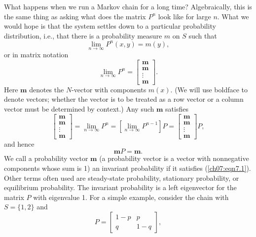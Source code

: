 \documentclass{stml-l}
\theoremstyle{definition}
\numberwithin{equation}{chapter}
\numberwithin{figure}{chapter}
\numberwithin{figure}{section}
\begin{document}
What happens when we run a Markov chain for a long time?
Algebraically, this is the same thing as asking what does the matrix
$P^{n}$ look like for large $n$. What we would hope is that the
system settles down to a particular probability distribution, i.e.,
that there is a probability measure $m$ on $S$ such that
\begin{equation*}
\lim\limits_{n\rightarrow\infty}P^{n}(x,y)=m(y),
\end{equation*}
or in matrix notation
\begin{equation*}
\lim\limits_{n\rightarrow\infty}P^{n}=\left[\begin{array}{c}
\mathbf{m}\\
\mathbf{m}\\
\vdots\\
\mathbf{m}
\end{array}\right].
\end{equation*}
Here $\mathbf{m}$ denotes the $N$-vector with components $m(x)$.
(We will use boldface to denote vectors; whether the vector is to be
treated as a row vector or a column vector must be determined by
context.) Any such $\mathbf{m}$ satisfies
\begin{equation*}
\left[\begin{array}{c}
\mathbf{m}\\
\mathbf{m}\\
\vdots\\
\mathbf{m}
\end{array}\right]=\lim\limits_{n\rightarrow\infty}P^{n}=\left[\lim\limits_{n\rightarrow\infty}P^{n-1}\right]P=\left[\begin{array}{c}
\mathbf{m}\\
\mathbf{m}\\
\vdots\\
\mathbf{m}
\end{array}\right] P,
\end{equation*}
and hence
\begin{equation}
\label{ch07:eqn7.1}\mathbf{m}P=\mathbf{m}.
\end{equation}
We call a probability vector $\mathbf{m}$ (a probability vector is a
vector with nonnegative components whose sum is 1) an invariant
probability if it satisfies (\ref{ch07:eqn7.1}). Other terms often
used are steady-state probability, stationary probability, or
equilibrium probability. The invariant probability is a left
eigenvector for the matrix $P$ with eigenvalue 1. For a simple
example, consider the chain with $S=\{1,2\}$ and
\begin{equation*}
P=\left[\begin{array}{cc}
1-p & p\\
q & 1-q
\end{array}\right],
\end{equation*}
\end{document}
